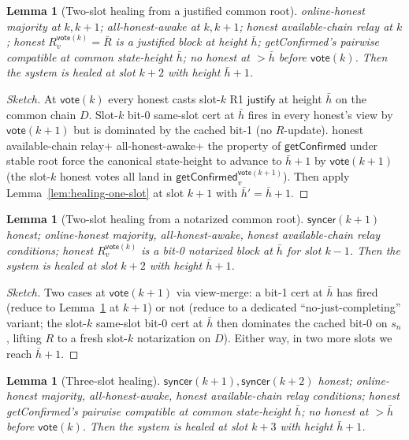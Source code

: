 \documentclass{article}
\newcommand{\just}{\ensuremath{\mathsf{justify}}\xspace}
\newcommand{\vote}{\mathsf{vote}}
\newcommand{\syncer}{\mathsf{syncer}}
\newcommand{\OHM}{online-honest majority\xspace}
\newcommand{\HAR}{honest available-chain relay\xspace}
\newcommand{\AHA}{all-honest-awake\xspace}
\newcommand{\getConfirmed}{\textsf{getConfirmed}\xspace}
\newcommand{\comm}[1]{\bar{#1}}
\theoremstyle{plain}
\newtheorem{lemma}[theorem]{Lemma}
\theoremstyle{definition}
\theoremstyle{remark}
\begin{document}
\begin{lemma}[Two-slot healing from a justified common root]\label{lem:healing-from-justified}
\OHM at $k, k+1$; \AHA at $k, k+1$; \HAR at $k$; honest $R_v^{\vote(k)} = \comm{R}$ is a justified block at height $\comm{h}$; \getConfirmed{}'s pairwise compatible at common state-height $\comm{h}$; no honest at $> \comm{h}$ before $\vote(k)$. Then the system is healed at slot $k+2$ with height $\comm{h}+1$.
\end{lemma}

\begin{proof}[Sketch] At $\vote(k)$ every honest casts slot-$k$ R1 \just{} at height $\comm{h}$ on the common chain $D$. Slot-$k$ bit-0 same-slot cert at $\comm{h}$ fires in every honest's view by $\vote(k+1)$ but is dominated by the cached bit-1 (no $R$-update). \HAR + \AHA + the property of $\getConfirmed$ under stable root force the canonical state-height to advance to $\comm{h}+1$ by $\vote(k+1)$ (the slot-$k$ honest votes all land in $\getConfirmed_v^{\vote(k+1)}$). Then apply Lemma~\ref{lem:healing-one-slot} at slot $k+1$ with $\comm{h}' = \comm{h}+1$. \end{proof}

\begin{lemma}[Two-slot healing from a notarized common root]\label{lem:healing-from-notarized}
$\syncer(k+1)$ honest; \OHM, \AHA, \HAR conditions; honest $R_v^{\vote(k)}$ is a bit-0 notarized block at $\comm{h}$ for slot $k-1$. Then the system is healed at slot $k+2$ with height $\comm{h}+1$.
\end{lemma}

\begin{proof}[Sketch] Two cases at $\vote(k+1)$ via view-merge: a bit-1 cert at $\comm{h}$ has fired (reduce to Lemma~\ref{lem:healing-from-justified} at $k+1$) or not (reduce to a dedicated ``no-just-completing'' variant; the slot-$k$ same-slot bit-0 cert at $\comm{h}$ then dominates the cached bit-0 on $s_n$, lifting $R$ to a fresh slot-$k$ notarization on $D$). Either way, in two more slots we reach $\comm{h}+1$. \end{proof}

\begin{lemma}[Three-slot healing]\label{lem:healing-three-slot}
$\syncer(k+1), \syncer(k+2)$ honest; \OHM, \AHA, \HAR conditions; honest \getConfirmed{}'s pairwise compatible at common state-height $\comm{h}$; no honest at $> \comm{h}$ before $\vote(k)$. Then the system is healed at slot $k+3$ with height $\comm{h}+1$.
\end{lemma}
\end{document}
